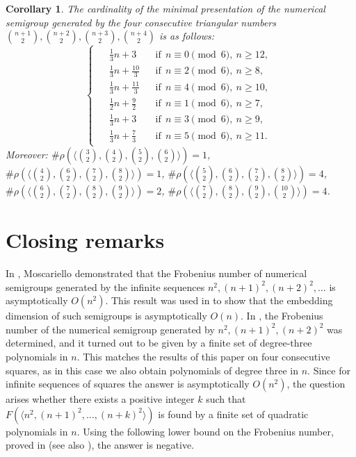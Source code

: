 \documentclass[12pt]{article}
\newtheorem{cor}[thm]{Corollary}
\theoremstyle{remark}
\begin{document}
\begin{cor}\label{corbettitriangular}
The cardinality of the minimal presentation of the numerical semigroup generated by the four consecutive triangular numbers $\binom{n+1}{2},\binom{n+2}{2}, \binom{n+3}{2}, \binom{n+4}{2}$ is as follows:
$$
\begin{cases}
\begin{aligned}
&\frac{1}{3}n + 3
    &&\text{if} \ \ n \equiv 0 \pmod{6},\ n \ge 12,\\
&\frac{1}{3}n + \frac{10}{3}
    &&\text{if} \ \ n \equiv 2 \pmod{6},\ n \ge 8,\\
&\frac{1}{3}n + \frac{11}{3}
    &&\text{if} \ \ n \equiv 4 \pmod{6},\ n \ge 10,\\
&\frac{1}{2}n + \frac{9}{2}
    &&\text{if} \ \ n \equiv 1 \pmod{6},\ n \ge 7,\\
&\frac{1}{3}n + 3
    &&\text{if} \ \ n \equiv 3 \pmod{6},\ n \ge 9,\\
&\frac{1}{3}n + \frac{7}{3}
    &&\text{if} \ \ n \equiv 5 \pmod{6},\ n \ge 11.
\end{aligned}
\end{cases}
$$
Moreover: $\# \rho \left( \langle \binom{3}{2},\binom{4}{2},\binom{5}{2},\binom{6}{2} \rangle \right) = 1$, $\# \rho \left( \langle \binom{4}{2},\binom{6}{2},\binom{7}{2},\binom{8}{2} \rangle \right) = 1$, $\# \rho \left( \langle \binom{5}{2},\binom{6}{2},\binom{7}{2},\binom{8}{2} \rangle \right)  = 4$, $\#\rho \left( \langle \binom{6}{2},\binom{7}{2},\binom{8}{2},\binom{9}{2} \rangle \right) = 2$, $\# \rho \left( \langle \binom{7}{2},\binom{8}{2},\binom{9}{2},\binom{10}{2} \rangle \right) = 4$.    
 
\end{cor}

\section{Closing remarks}\label{closingremarks}

In \cite{Moscariello2015}, Moscariello demonstrated that the Frobenius number of numerical semigroups generated by the infinite sequences $n^2,(n+1)^2, (n+2)^2, \dots$ is asymptotically $O(n^2)$. This result was used in \cite{Arias2025} to show that the embedding dimension of such semigroups is asymptotically $O(n)$. In \cite{Lepilov2015}, the Frobenius number of the numerical semigroup generated by $n^2,(n+1)^2,(n+2)^2$ was determined, and it turned out to be given by a finite set of degree-three polynomials in $n$. This matches the results of this paper on four consecutive squares, as in this case we also obtain polynomials of degree three in $n$. Since for infinite sequences of squares the answer is asymptotically $O(n^2)$, the question arises whether there exists a positive integer $k$ such that $F(\langle n^2,(n+1)^2, \dots, (n+k)^2\rangle)$ is found by a finite set of quadratic polynomials in $n$. Using the following lower bound on the Frobenius number, proved in \cite{Killingbergtro2000} (see also \cite[Chapter 3]{RamirezAlfonsin2005}), the answer is negative.
\end{document}

